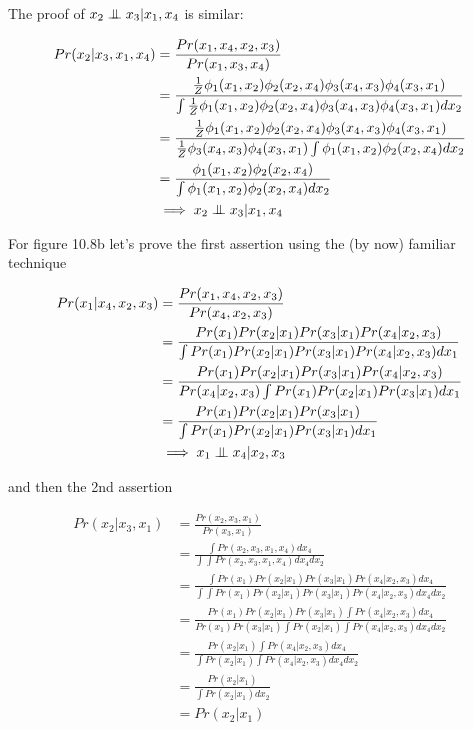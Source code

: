 \documentclass[11pt]{report}
\newcommand\independent{\protect\mathpalette{\protect\independenT}{\perp}}
\def\independenT#1#2{\mathrel{\rlap{$#1#2$}\mkern4mu{#1#2}}}
\begin{document}
The proof of $x_2 \independent x_3 | x_1, x_4$ is similar:

\begin{align*}
Pr(x_2 | x_3, x_1, x_4) & = \frac{Pr(x_1, x_4, x_2, x_3)}{Pr(x_1, x_3, x_4)} \\
   & = \frac{\frac{1}{Z} \phi_1(x_1, x_2) \phi_2(x_2, x_4) \phi_3(x_4, x_3) \phi_4(x_3, x_1)}
            {\int \frac{1}{Z} \phi_1(x_1, x_2) \phi_2(x_2, x_4) \phi_3(x_4, x_3) \phi_4(x_3, x_1) dx_2} \\
   & = \frac{\frac{1}{Z} \phi_1(x_1, x_2) \phi_2(x_2, x_4) \phi_3(x_4, x_3) \phi_4(x_3, x_1)}
            {\frac{1}{Z}  \phi_3(x_4, x_3) \phi_4(x_3, x_1)\int \phi_1(x_1, x_2) \phi_2(x_2, x_4)  dx_2} \\
   & = \frac{ \phi_1(x_1, x_2) \phi_2(x_2, x_4)}
            {\int \phi_1(x_1, x_2) \phi_2(x_2, x_4)  dx_2} \\
            & \implies x_2 \independent x_3 | x_1, x_4
\end{align*}

For figure 10.8b let's prove the first assertion using the (by now) familiar technique

\begin{align*}
Pr(x_1 | x_4, x_2, x_3) & = \frac{Pr(x_1, x_4, x_2, x_3)}{Pr(x_4, x_2, x_3)} \\
    & = \frac{Pr(x_1) Pr(x_2 | x_1) Pr(x_3 | x_1) Pr(x_4 | x_2, x_3)}{\int  Pr(x_1) Pr(x_2 | x_1) Pr(x_3 | x_1) Pr(x_4 | x_2, x_3) dx_1} \\
    & =  \frac{Pr(x_1) Pr(x_2 | x_1) Pr(x_3 | x_1) Pr(x_4 | x_2, x_3)}{Pr(x_4 | x_2, x_3) \int  Pr(x_1) Pr(x_2 | x_1) Pr(x_3 | x_1)  dx_1} \\
    & =  \frac{Pr(x_1) Pr(x_2 | x_1) Pr(x_3 | x_1) }{\int  Pr(x_1) Pr(x_2 | x_1) Pr(x_3 | x_1)  dx_1} \\
    & \implies x_1 \independent x_4 | x_2, x_3
\end{align*}

and then the 2nd assertion

\begin{align*}
Pr(x_2 | x_3, x_1) & = \frac{Pr(x_2, x_3, x_1)}{Pr(x_3, x_1)} \\
    & = \frac{\int Pr(x_2, x_3, x_1, x_4) dx_4}{\int \int Pr(x_2, x_3, x_1, x_4) dx_4 dx_2} \\
    & = \frac{\int Pr(x_1) Pr(x_2 | x_1) Pr(x_3 | x_1) Pr(x_4 | x_2, x_3) dx_4}
                 {\int \int Pr(x_1) Pr(x_2 | x_1) Pr(x_3 | x_1) Pr(x_4 | x_2, x_3)  dx_4 dx_2} \\
    & = \frac{Pr(x_1) Pr(x_2 | x_1) Pr(x_3 | x_1) \int  Pr(x_4 | x_2, x_3) dx_4}
                 {Pr(x_1) Pr(x_3 | x_1) \int  Pr(x_2 | x_1) \int Pr(x_4 | x_2, x_3)  dx_4 dx_2} \\
    & = \frac{Pr(x_2 | x_1) \int  Pr(x_4 | x_2, x_3) dx_4}
                 { \int  Pr(x_2 | x_1) \int Pr(x_4 | x_2, x_3)  dx_4 dx_2} \\
    & = \frac{Pr(x_2 | x_1) }{ \int  Pr(x_2 | x_1)  dx_2} \\
    & = Pr(x_2 | x_1)
\end{align*}
\end{document}
